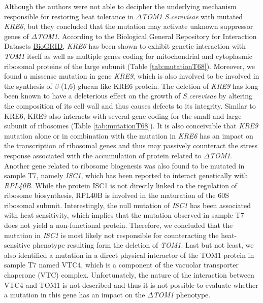 \documentclass[10pt,a4paper]{article}
\begin{document}
\noindent Although the authors were not able to decipher the underlying mechanism responsible for restoring heat tolerance in\textit{ $\Delta$TOM1 S.cerevisae} with mutated \textit{KRE6}, but they concluded that the mutation may activate unknown suppressor genes of \textit{$\Delta$TOM1}. According to the Biological General Repository for Interaction Datasets \href{https://thebiogrid.org/}{BioGRID}, \textit{KRE6} has been shown to exhibit genetic interaction with \textit{TOM1} itself as well as multiple genes coding for mitochondrial and cytoplasmic ribosomal proteins of the large subunit (Table \ref{tab:mutationT68}). Moreover, we found a missense mutation in gene \textit{KRE9}, which is also involved to be involved in the synthesis of $\beta$-(1,6)-glucan like KRE6 protein. The deletion of \textit{KRE9}  has long been known to have a deleterious effect on the growth of \textit{S.cerevisae} by altering the composition of its cell wall and thus causes defects to its integrity\cite{brown_yeast_1993}. Similar to KRE6, KRE9 also interacts with several gene coding for the small and large subunit of ribosomes (Table \ref{tab:mutationT68}). It is also conceivable that \textit{KRE9} mutation alone or in combination with the mutation in \textit{KRE6} has an impact on the transcription of ribosomal genes and thus may passively counteract the stress response associated with the accumulation of protein related to \textit{$\Delta$TOM1}. Another gene related to ribosome biogenesis was also found to be mutated in sample T7, namely \textit{ISC1}, which has been reported to interact genetically with \textit{RPL40B}\cite{hoppins_mitochondrial-focused_2011}. While the protein ISC1 is not directly linked to the regulation of ribosome biosynthesis, RPL40B is involved in the maturation of the 60S ribosomal subunit\cite{fernandez-pevida_yeast_2012}. Interestingly, the null mutation of \textit{ISC1} has been associated with heat sensitivity, which implies that the mutation observed in sample T7 does not yield a non-functional protein. Therefore, we concluded that the mutation in \textit{ISC1} is most likely not responsible for counteracting the heat-sensitive phenotype resulting form the deletion of \textit{TOM1}. Last but not least, we also identified a mutation in a direct physical interactor of the TOM1 protein in sample T7 named VTC4, which is a component of the vacuolar transporter chaperone (VTC) complex\cite{muller_role_2003}. Unfortunately, the nature of the interaction between VTC4 and TOM1 is not described and thus it is not possible to evaluate whether a mutation in this gene has an impact on the \textit{$\Delta$TOM1} phenotype.\\
 
\end{document}
